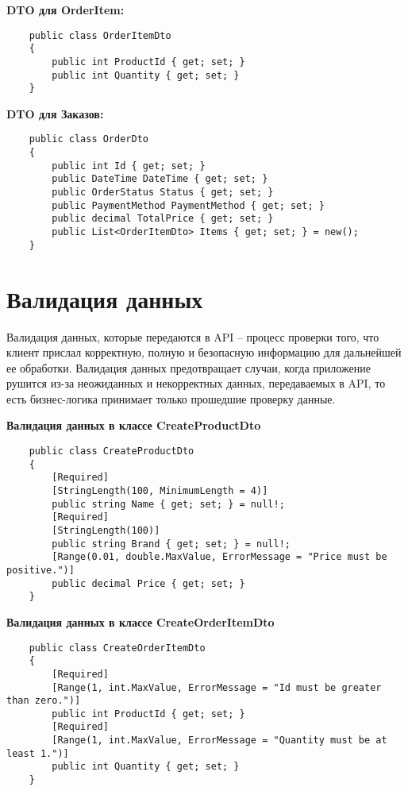 \documentclass[a4paper,12pt]{report}
\begin{document}
\textbf{\acs{DTO} для OrderItem:}

\begin{verbatim}
    public class OrderItemDto
    {
        public int ProductId { get; set; }
        public int Quantity { get; set; }
    }
\end{verbatim}

\textbf{\acs{DTO} для Заказов:}

\begin{verbatim}
    public class OrderDto
    {
        public int Id { get; set; }
        public DateTime DateTime { get; set; }
        public OrderStatus Status { get; set; }
        public PaymentMethod PaymentMethod { get; set; }
        public decimal TotalPrice { get; set; }
        public List<OrderItemDto> Items { get; set; } = new();
    }
\end{verbatim}

\section{Валидация данных}

Валидация данных, которые передаются в \acs{API} -- процесс проверки того, что клиент прислал корректную, полную и безопасную информацию для дальнейшей ее обработки. 
Валидация данных предотвращает случаи, когда приложение рушится из-за неожиданных и некорректных данных, передаваемых в \acs{API}, то есть бизнес-логика принимает 
только прошедшие проверку данные.

\textbf{Валидация данных в классе CreateProductDto}
\begin{verbatim}
    public class CreateProductDto
    {
        [Required]
        [StringLength(100, MinimumLength = 4)]
        public string Name { get; set; } = null!;
        [Required]
        [StringLength(100)]
        public string Brand { get; set; } = null!;
        [Range(0.01, double.MaxValue, ErrorMessage = "Price must be positive.")]
        public decimal Price { get; set; }
    }
\end{verbatim}

\textbf{Валидация данных в классе CreateOrderItemDto}
\begin{verbatim}
    public class CreateOrderItemDto
    {
        [Required]
        [Range(1, int.MaxValue, ErrorMessage = "Id must be greater than zero.")]
        public int ProductId { get; set; }
        [Required]
        [Range(1, int.MaxValue, ErrorMessage = "Quantity must be at least 1.")]
        public int Quantity { get; set; }
    }
\end{verbatim}
\end{document}
